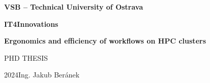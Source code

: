 \documentclass[11pt]{article}
\newcommand{\BookCover}[7]
{
	\sffamily
	\begin{center}
		\Huge
		\textbf{#1}\par\medskip
		\textbf{#2}\par
		\vspace{#3}
		\textbf{#4}\par\bigskip
		#5
	\end{center}
	\vfill
	{\Huge#6\hfill#7}
	\clearpage
}
\begin{document}
\BookCover{VSB -- Technical University of Ostrava}{IT4Innovations}{54mm}{Ergonomics and efficiency of workflows on HPC clusters}{PHD THESIS}{2024}{Ing. Jakub Beránek}
\end{document}
